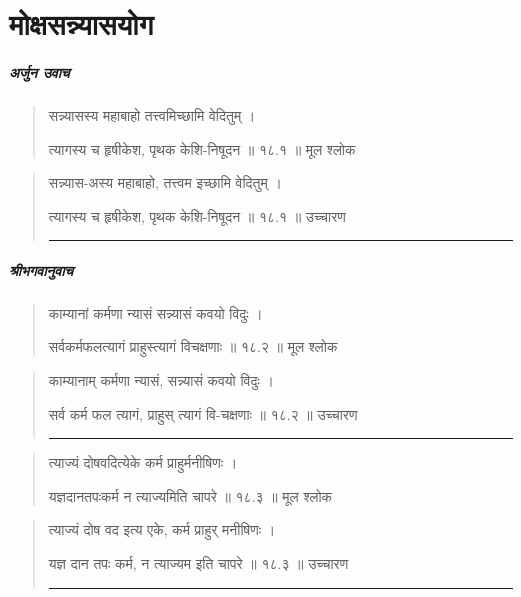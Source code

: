 \chapter{\sanskrit मोक्षसन्न्यासयोग} 
\paragraph{\sanskrit अर्जुन उवाच}
\begin{quotation} 
सन्न्यासस्य महाबाहो तत्त्वमिच्छामि वेदितुम्‌  ।  

त्यागस्य च हृषीकेश, पृथक केशि-निषूदन  ॥ १८.१ ॥  मूल श्लोक
\end{quotation}

\begin{quotation}

सन्न्यास-अस्य महाबाहो, तत्त्वम इच्छामि वेदितुम्‌  ।  

त्यागस्य च हृषीकेश, पृथक केशि-निषूदन  ॥ १८.१ ॥  उच्चारण

\noindent\rule{16cm}{0.4pt} 
\end{quotation}




\paragraph{\sanskrit श्रीभगवानुवाच}
\begin{quotation} 
काम्यानां कर्मणा न्यासं सन्न्यासं कवयो विदुः  ।  

सर्वकर्मफलत्यागं प्राहुस्त्यागं विचक्षणाः  ॥ १८.२ ॥  मूल श्लोक
\end{quotation}

\begin{quotation}

काम्यानाम् कर्मणा न्यासं, सन्न्यासं कवयो विदुः  ।  

सर्व कर्म फल त्यागं, प्राहुस् त्यागं वि-चक्षणाः  ॥ १८.२ ॥  उच्चारण

\noindent\rule{16cm}{0.4pt} 
\end{quotation}


\begin{quotation}

त्याज्यं दोषवदित्येके कर्म प्राहुर्मनीषिणः  ।  

यज्ञदानतपःकर्म न त्याज्यमिति चापरे  ॥ १८.३ ॥  मूल श्लोक
\end{quotation}

\begin{quotation}

त्याज्यं दोष वद इत्य एके, कर्म प्राहुर् मनीषिणः  ।  

यज्ञ दान तपः कर्म, न त्याज्यम इति चापरे  ॥ १८.३ ॥  उच्चारण

\noindent\rule{16cm}{0.4pt} 
\end{quotation}


